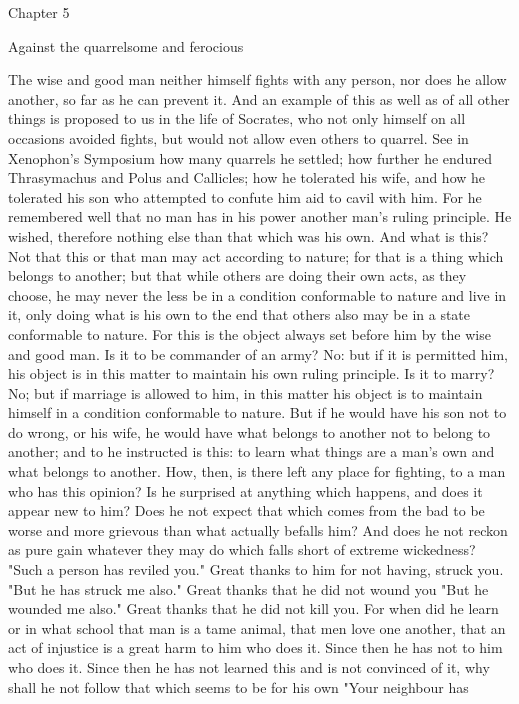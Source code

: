 \documentclass[a4paper]{article}
\begin{document}
Chapter 5

Against the quarrelsome and ferocious

    The wise and good man neither himself fights with any person, nor does he
allow another, so far as he can prevent it. And an example of this as well as
of all other things is proposed to us in the life of Socrates, who not only
himself on all occasions avoided fights, but would not allow even others to
quarrel. See in Xenophon's Symposium how many quarrels he settled; how further
he endured Thrasymachus and Polus and Callicles; how he tolerated his wife, and
how he tolerated his son who attempted to confute him aid to cavil with him.
For he remembered well that no man has in his power another man's ruling
principle. He wished, therefore nothing else than that which was his own. And
what is this? Not that this or that man may act according to nature; for that
is a thing which belongs to another; but that while others are doing their own
acts, as they choose, he may never the less be in a condition conformable to
nature and live in it, only doing what is his own to the end that others also
may be in a state conformable to nature. For this is the object always set
before him by the wise and good man. Is it to be commander of an army? No: but
if it is permitted him, his object is in this matter to maintain his own ruling
principle. Is it to marry? No; but if marriage is allowed to him, in this
matter his object is to maintain himself in a condition conformable to nature.
But if he would have his son not to do wrong, or his wife, he would have what
belongs to another not to belong to another; and to he instructed is this: to
learn what things are a man's own and what belongs to another.
    How, then, is there left any place for fighting, to a man who has this
opinion? Is he surprised at anything which happens, and does it appear new to
him? Does he not expect that which comes from the bad to be worse and more
grievous than what actually befalls him? And does he not reckon as pure gain
whatever they may do which falls short of extreme wickedness? "Such a person
has reviled you." Great thanks to him for not having, struck you. "But he has
struck me also." Great thanks that he did not wound you "But he wounded me
also." Great thanks that he did not kill you. For when did he learn or in what
school that man is a tame animal, that men love one another, that an act of
injustice is a great harm to him who does it. Since then he has not to him who
does it. Since then he has not learned this and is not convinced of it, why
shall he not follow that which seems to be for his own "Your neighbour has
\end{document}
